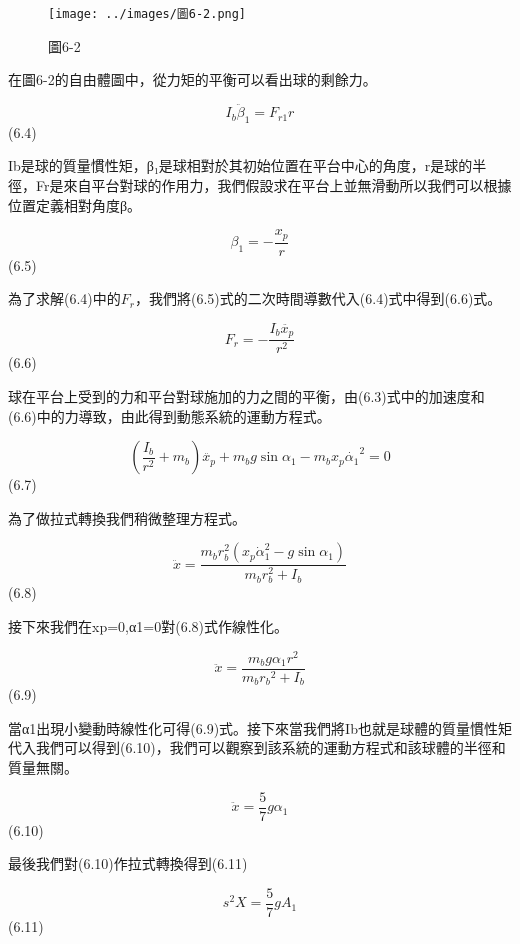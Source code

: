 \begin{figure}[h]
\centering
\texttt{[image: ../images/圖6-2.png]}
\label{圖6-2}
\caption{圖6-2}
\end{figure}

在圖6-2的自由體圖中，從力矩的平衡可以看出球的剩餘力。

\begin{equation}
I_b \ddot{\beta}_1=F_{r 1} r
\end{equation} 
(6.4)

Ib是球的質量慣性矩，β₁是球相對於其初始位置在平台中心的角度，r是球的半徑，Fr是來自平台對球的作用力，我們假設求在平台上並無滑動所以我們可以根據位置定義相對角度β。

\begin{equation}
\beta_1=-\frac{x_p}{r}
\end{equation} 
(6.5)

為了求解(6.4)中的\(F_r\)，我們將(6.5)式的二次時間導數代入(6.4)式中得到(6.6)式。

\begin{equation}
F_r=-\frac{I_b \ddot{x_p}}{r^2}
\end{equation} 
(6.6)

球在平台上受到的力和平台對球施加的力之間的平衡，由(6.3)式中的加速度和(6.6)中的力導致，由此得到動態系統的運動方程式。

\begin{equation}
\left(\frac{I_b}{r^2}+m_b\right) \ddot{x_p}+m_b g \sin \alpha_1-m_b x_p{\dot{\alpha_1}}^2=0
\end{equation} 
(6.7)

為了做拉式轉換我們稍微整理方程式。

\begin{equation}
\ddot{x}=\frac{m_b r_b^2\left(x_p \dot{\alpha}_1^2-g \sin \alpha_1\right)}{m_b r_b^2+I_b}
\end{equation} 
(6.8)

接下來我們在xp=0,α1=0對(6.8)式作線性化。

\begin{equation}
\ddot{x}=\frac{m_b g \alpha_1 r^2}{m_b r_b{ }^2+I_b}
\end{equation}
(6.9)

當α1出現小變動時線性化可得(6.9)式。接下來當我們將Ib也就是球體的質量慣性矩代入我們可以得到(6.10)，我們可以觀察到該系統的運動方程式和該球體的半徑和質量無關。

\begin{equation}
\ddot{x}=\frac{5}{7} g \alpha_1
\end{equation}
(6.10)

最後我們對(6.10)作拉式轉換得到(6.11)

\begin{equation}
s^2 X=\frac{5}{7} g A_1
\end{equation}
(6.11)